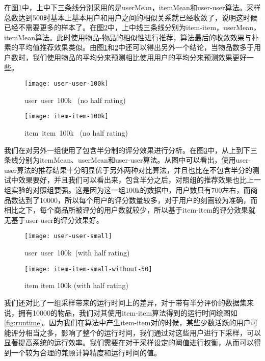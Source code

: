 在图\ref{fig:useruser100k}中，上中下三条线分别采用的是userMean，itemMean和user-user算法。采样总数达到500时基本上基本用户和用户之间的相似关系就已经收敛了，说明这时候已经不需要更多的样本了。在图\ref{fig:itemitem100k}中，上中线三条线分别为item-item，userMean，itemMean算法。此时使用物品-物品的相似性进行推荐，算法最后的收敛效果与朴素的平均值推荐效果类似。由图\ref{fig:useruser100k}和\ref{fig:itemitem100k}中还可以得出另外一个结论，当物品数多于用户数时，我们使用物品的平均分来预测相比使用用户的平均分来预测效果更好一些。
\begin{figure}[ht]
\centering
\texttt{[image: user-user-100k]}
\caption{user\ user\ 100k \ (no half rating)}\label{fig:useruser100k}
\end{figure}

\begin{figure}[ht]
\centering
\texttt{[image: item-item-100k]}
\caption{item\ item\ 100k \ (no half rating)}\label{fig:itemitem100k}
\end{figure}

我们在对另外一组使用了包含半分制的评分效果进行分析。在图\ref{userusersmall}中，从上到下三条线分别为itemMean、userMean和user-user算法。从图中可以看出，使用user-user算法的推荐结果十分明显优于另外两种对比算法，并且也比在不包含半分的测试中效果要好，并且我们可以看出来，包含半分之后，对照组的推荐效果也比上一组实验的对照组要强。这是因为这一组100k的数据中，用户数只有700左右，而商品数达到了10000，所以每个用户的评分数量较多，对于用户的刻画较为准确，而相比之下，每个商品所被评分的用户数就较少，所以基于item-item的评分效果就无基于user-user的评分效果好。
\begin{figure}[ht]
\centering
\texttt{[image: user-user-small]}
\caption{user\ user\ 100k\ (with half rating)}\label{userusersmall}
\end{figure}

\begin{figure}[ht]
\centering
\texttt{[image: item-item-small-without-50]}
\caption{item item 100k (with half rating)}\label{fig:itemitemsmall}
\end{figure}

我们还对比了一组采样带来的运行时间上的差异，对于带有半分评价的数据集来说，拥有10000的物品，我们对其使用item-item算法得到的运行时间绘图如\ref{fig:runtime}。因为我们在算法中产生item-item对的时候，某些少数活跃的用户可能评分相当之多，影响了整个的运行时间，我们通过对这些用户进行下采样，可以显著提高系统的运行效率。我们需要在对于采样设定的阈值进行权衡，从而可以得到一个较为合理的兼顾计算精度和运行时间的值。

